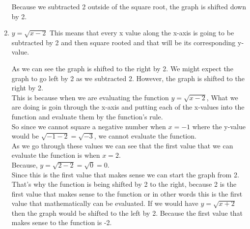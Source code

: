 \begin{enumerate}
		  Because we subtracted 2 outside of the square root, the graph is shifted down by 2.
		  \item $y=\sqrt{x-2}$ This means that every x value along the x-axis is going to be subtracted by 2 and then square rooted and that will be its corresponding y-value. \\
		  As we can see the graph is shifted to the right by 2.  We might expect the graph to go left by 2 as we subtracted 2. However, the graph is shifted to the right by 2. \\
		  This is because when we are evaluating the function $y=\sqrt{x-2}$, What we are doing is goin through the x-axis and putting each of the x-values into the function and evaluate them by the function's rule. \\
		  So since we cannot square a negative number when $x=-1$ where the y-value would be $\sqrt{-1-2}=\sqrt{-3}$, we cannot evaluate the function. \\
		  As we go through these values we can see that the first value that we can evaluate the function is when $x=2$. \\
		  Because, $y=\sqrt{2-2}=\sqrt{0}=0$. \\
		  Since this is the first value that makes sense we can start the graph from 2. \\
		  That's why the function is being shifted by 2 to the right, because 2 is the first value that makes sense to the function or in other words this is the first value that mathematically can be evaluated. 
		  If we would have $y=\sqrt{x+2}$ then the graph would be shifted to the left by 2. Because the first value that makes sense to the function is -2. \\
\end{enumerate}

